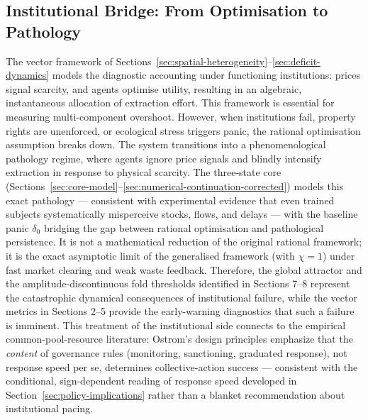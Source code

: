 \documentclass[twocolumn,10pt]{article}
\begin{document}
\subsection{Institutional Bridge: From Optimisation to Pathology}
The vector framework of Sections~\ref{sec:spatial-heterogeneity}--\ref{sec:deficit-dynamics} models the diagnostic accounting under functioning institutions: prices signal scarcity, and agents optimise utility, resulting in an algebraic, instantaneous allocation of extraction effort. This framework is essential for measuring multi-component overshoot. However, when institutions fail, property rights are unenforced, or ecological stress triggers panic, the rational optimisation assumption breaks down. The system transitions into a phenomenological pathology regime, where agents ignore price signals and blindly intensify extraction in response to physical scarcity. The three-state core (Sections~\ref{sec:core-model}--\ref{sec:numerical-continuation-corrected}) models this exact pathology --- consistent with experimental evidence that even trained subjects systematically misperceive stocks, flows, and delays \cite{cronin2009} --- with the baseline panic \(\delta_0\) bridging the gap between rational optimisation and pathological persistence. It is not a mathematical reduction of the original rational framework; it is the exact asymptotic limit of the generalised framework (with \(\chi=1\)) under fast market clearing and weak waste feedback. Therefore, the global attractor and the amplitude-discontinuous fold thresholds identified in Sections 7--8 represent the catastrophic dynamical consequences of institutional failure, while the vector metrics in Sections 2--5 provide the early-warning diagnostics that such a failure is imminent. This treatment of the institutional side connects to the empirical common-pool-resource literature: Ostrom's design principles \cite{ostrom1990} emphasize that the \emph{content} of governance rules (monitoring, sanctioning, graduated response), not response speed per se, determines collective-action success --- consistent with the conditional, sign-dependent reading of response speed developed in Section~\ref{sec:policy-implications} rather than a blanket recommendation about institutional pacing.
\end{document}
